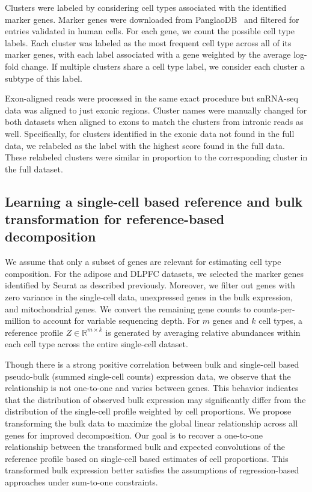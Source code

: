 Clusters were labeled by considering cell types associated with the identified marker genes. Marker genes were downloaded from PanglaoDB~\cite{Franzen2019-nb} and filtered for entries validated in human cells. For each gene, we count the possible cell type labels. Each cluster was labeled as the most frequent cell type across all of its marker genes, with each label associated with a gene weighted by the average log-fold change. If multiple clusters share a cell type label, we consider each cluster a subtype of this label. 

Exon-aligned reads were processed in the same exact procedure but snRNA-seq data was aligned to just exonic regions. Cluster names were manually changed for both datasets when aligned to exons to match the clusters from intronic reads as well. Specifically, for clusters identified in the exonic data not found in the full data, we relabeled as the label with the highest score found in the full data. These relabeled clusters were similar in proportion to the corresponding cluster in the full dataset.

\subsection{Learning a single-cell based reference and bulk transformation for reference-based decomposition}

We assume that only a subset of genes are relevant for estimating cell type composition. For the adipose and DLPFC datasets, we selected the marker genes identified by Seurat as described previously. Moreover, we filter out genes with zero variance in the single-cell data, unexpressed genes in the bulk expression, and mitochondrial genes. We convert the remaining gene counts to counts-per-million to account for variable sequencing depth. For $m$ genes and $k$ cell types, a reference profile $Z \in \mathbb{R}^{m \times k}$ is generated by averaging relative abundances within each cell type across the entire single-cell dataset.

Though there is a strong positive correlation between bulk and single-cell based pseudo-bulk (summed single-cell counts) expression data, we observe that the relationship is not one-to-one and varies between genes. This behavior indicates that the distribution of observed bulk expression may significantly differ from the distribution of the single-cell profile weighted by cell proportions. We propose transforming the bulk data to maximize the global linear relationship across all genes for improved decomposition. Our goal is to recover a one-to-one relationship between the transformed bulk and expected convolutions of the reference profile based on single-cell based estimates of cell proportions. This transformed bulk expression better satisfies the assumptions of regression-based approaches under sum-to-one constraints. 

